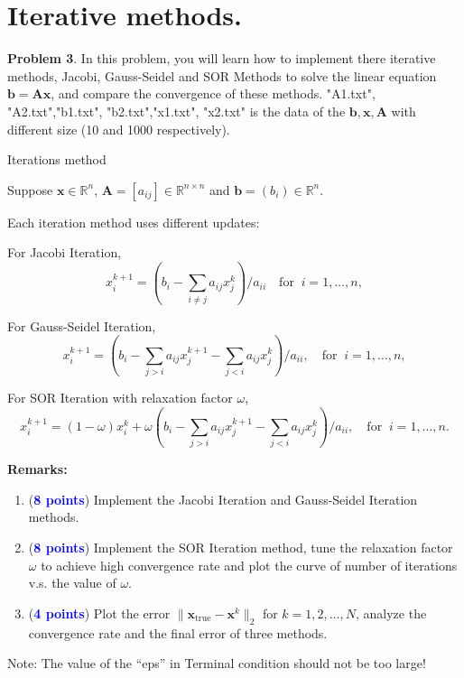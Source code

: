 \documentclass[english,onecolumn]{IEEEtran}
\begin{document}
\section{Iterative methods.}
\noindent\textbf{Problem 3}.
In this problem, you will learn how to implement there iterative methods, Jacobi, Gauss-Seidel and SOR Methods to solve the linear equation $\mathbf{b}=\mathbf{Ax}$, and compare the convergence of these methods. 
"A1.txt", "A2.txt","b1.txt", "b2.txt","x1.txt", "x2.txt" is the data of the $\mathbf{b}, \mathbf{x}, \mathbf{A}$ with different size (10 and 1000 respectively).
\begin{algorithm}
	\caption{Iterations method}
	\label{algo:Jacobi}
    \LinesNumbered
\end{algorithm}

Suppose $\mathbf{x}\in\mathbb{R}^{n}$, $\mathbf{A}=[a_{ij}]\in\mathbb{R}^{n\times n}$ and $\mathbf{b}=(b_i)\in\mathbb{R}^{n}$.

Each iteration method uses different updates:

For Jacobi Iteration, 
\begin{equation*}
    x_i^{k+1} = (b_i - \sum_{i \neq j} a_{ij}x_j^k) / a_{ii} \quad \text{for }\ i = 1,\dots, n,
\end{equation*}

For Gauss-Seidel Iteration, 
\begin{equation*}
    x_i^{k+1} = (b_i - \sum_{j > i} a_{ij}x_j^{k+1} - \sum_{j < i} a_{ij}x_j^{k}) / a_{ii}, \quad \text{for }\ i = 1,\dots, n,
\end{equation*}

For SOR Iteration with relaxation factor $\omega$, 
\begin{equation*}
    x_i^{k+1} = (1-\omega) x_i^{k} + \omega \left(b_i - \sum_{j>i} a_{ij}x_j^{k+1} - \sum_{j<i} a_{ij}x_j^{k}\right) / a_{ii}, \quad \text{for }\ i = 1,\dots, n.
\end{equation*}

\textbf{Remarks:}
\begin{enumerate}
    \item (\textcolor{blue}{\textbf{8 points}}) Implement the Jacobi Iteration and Gauss-Seidel Iteration methods.
    \item (\textcolor{blue}{\textbf{8 points}}) Implement the SOR Iteration method, tune the relaxation factor $\omega$ to achieve high convergence rate and plot the curve of number of iterations v.s. the value of $\omega$.
    \item (\textcolor{blue}{\textbf{4 points}}) Plot the error $\|\mathbf{x}_{\mathrm{true}} - \mathbf{x}^k\|_2$ for $k=1,2,\dots,N$, analyze the convergence rate and the final error of three methods.
\end{enumerate}
Note: The value of the ``eps'' in Terminal condition should not be too large!
\end{document}
